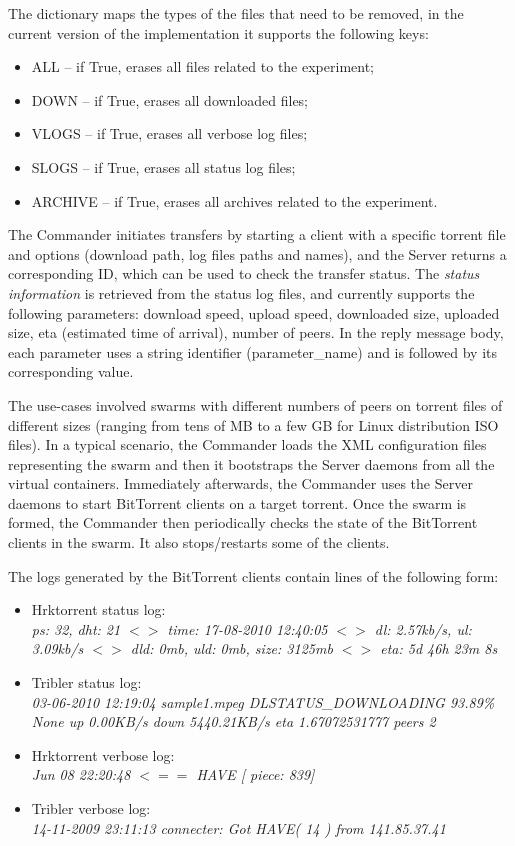 The dictionary maps the types of the files that need to be removed, in the
current version of the implementation it supports the following keys:

\begin{itemize}
  \item ALL -- if True, erases all files related to the experiment;
  \item DOWN -- if True, erases all downloaded files;
  \item VLOGS -- if True, erases all verbose log files;
  \item SLOGS -- if True, erases all status log files;
  \item ARCHIVE -- if True, erases all archives related to the experiment.
\end{itemize}

The Commander initiates transfers by starting a client with a specific torrent
file and options (download path, log files paths and names), and the Server
returns a corresponding ID, which can be used to check the transfer status.
The \textit{status information} is retrieved from the status log files, and
currently supports the following parameters: download speed, upload speed,
downloaded size, uploaded size, eta (estimated time of arrival), number of
peers. In the reply message body, each parameter uses a string identifier
(parameter_name) and is followed by its corresponding value.

The use-cases involved swarms with different numbers of peers on torrent files
of different sizes (ranging from tens of MB to a few GB for Linux distribution
ISO files). In a typical scenario, the Commander loads the XML configuration
files representing the swarm and then it bootstraps the Server daemons from
all the virtual containers. Immediately afterwards, the Commander uses the
Server daemons to start BitTorrent clients on a target torrent. Once the swarm
is formed, the Commander then periodically checks the state of the BitTorrent
clients in the swarm. It also stops/restarts some of the clients.

The logs generated by the BitTorrent clients contain lines of the following
form:

\begin{itemize}
  \item Hrktorrent status log:\\
  \textit{ ps: 32, dht: 21 $<>$ time: 17-08-2010 12:40:05 $<>$ dl: 2.57kb/s,
  ul: 3.09kb/s $<>$ dld: 0mb, uld: 0mb, size: 3125mb $<>$ eta: 5d 46h 23m 8s}
  \item Tribler status log:\\
  \textit{03-06-2010 12:19:04 sample1.mpeg DLSTATUS_DOWNLOADING 93.89\% None
  up 0.00KB/s down  5440.21KB/s eta 1.67072531777 peers 2}
  \item Hrktorrent verbose log:\\
  \textit{Jun 08 22:20:48 $<==$ HAVE [ piece: 839]}
  \item Tribler verbose log:\\
  \textit{14-11-2009 23:11:13 connecter: Got HAVE( 14 ) from 141.85.37.41}
\end{itemize}

